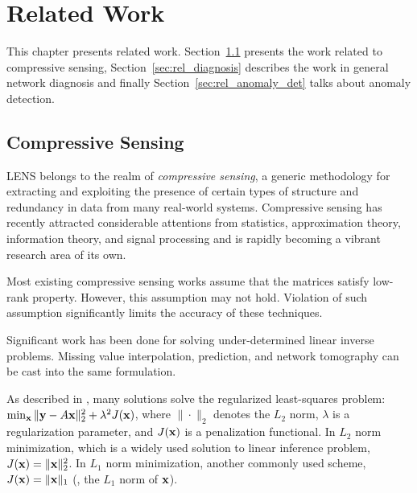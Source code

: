 \chapter{Related Work}
\label{chp:related}
%

This chapter presents related work. Section~\ref{sec:rel_cs} presents the work related to compressive sensing, Section~\ref{sec:rel_diagnosis} describes the work in general network diagnosis and finally Section~\ref{sec:rel_anomaly_det} talks about anomaly detection. 

\section{Compressive Sensing}
\label{sec:rel_cs}

LENS belongs to the realm of {\em compressive sensing}, a generic
methodology for extracting and exploiting the presence of certain
types of structure and redundancy in data from many real-world
systems. Compressive sensing has recently attracted considerable
attentions from statistics, approximation theory, information theory,
and signal processing
\cite{candes06:_compressive,donoho06:_compr_sensin,candes:_exact_matrix,recht:_guaran,recht08:_nec,zhang09sensing}
and is rapidly becoming a vibrant research area of its own.

Most existing compressive sensing works assume that the matrices
satisfy low-rank property. However, this assumption may not hold. 
Violation of such assumption significantly limits the accuracy of 
these techniques. 

Significant work has been done for solving
under-determined linear inverse problems. Missing value interpolation,
prediction, and network tomography can be cast into the same formulation.

As described in \cite{ZRLD03}, many solutions solve the
regularized least-squares problem:
$\min_{\mathbf{x}} \|\mathbf{y}-A\mathbf{x}\|_2^2 + \lambda^2 J(\mathbf{x})$,
where $\|\cdot\|_2$ denotes the $L_2$ norm, $\lambda$ is a
regularization parameter, and $J(\mathbf{x})$ is a penalization functional.
In $L_2$ norm minimization, which is a widely used solution to linear
inference problem, $J(\mathbf{x}) = \|\mathbf{x}\|_2^2$. In $L_1$ norm minimization,
another commonly used scheme, $J(\mathbf{x}) =
\|\mathbf{x}\|_1$ (\ie, the $L_1$ norm of $\mathbf{x}$). 


